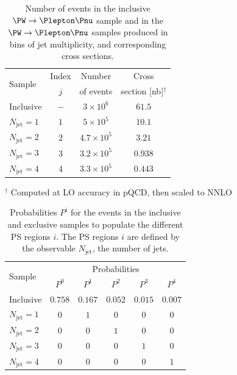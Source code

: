 \documentclass[twocolumn,epjc3]{svjour3}
\newcommand{\jet}{\ensuremath{\textrm{jet}}\xspace}
\begin{document}
\begin{table}
\caption{
  Number of events in the inclusive $\PW \to \Plepton\Pnu$ sample and in the $\PW \to \Plepton\Pnu$ samples produced in bins of jet multiplicity,
  and corresponding cross sections.
}
\label{tab:samples_WJets_vs_Njet}
\begin{center}
\begin{tabular}{l|c|c|c}
\hline
\multirow{2}{12mm}{Sample} & Index & Number    & Cross                    \\
                           & $j$   & of events & section [nb]$^{\dagger}$ \\
\hline
Inclusive                  & $-$   & $3 \times 10^{6}$   & $61.5$         \\
\hline
$N_{\jet} = 1$             & $1$   & $5 \times 10^{5}$   & $10.1$         \\
$N_{\jet} = 2$             & $2$   & $4.7 \times 10^{5}$ & $3.21$         \\
$N_{\jet} = 3$             & $3$   & $3.2 \times 10^{5}$ & $0.938$        \\
$N_{\jet} = 4$             & $4$   & $3.3 \times 10^{5}$ & $0.443$        \\
\hline
\end{tabular}
\end{center}
$^{\dagger}$ Computed at LO accuracy in pQCD, then scaled to NNLO
\end{table}

\begin{table}
\caption{
  Probabilities $P^{i}$ for the events in the inclusive and exclusive samples to populate the different PS regions $i$.
  The PS regions $i$ are defined by the observable $N_{\jet}$, the number of jets.
}
\label{tab:probabilities_WJets_vs_Njet}
\begin{center}
\begin{tabular}{l|ccccc}
\hline
\multirow{2}{12mm}{Sample} & \multicolumn{5}{c}{Probabilities}               \\
                           & $P^{0}$ & $P^{1}$ & $P^{2}$ & $P^{3}$ & $P^{4}$ \\
\hline
Inclusive                  & $0.758$ & $0.167$ & $0.052$ & $0.015$ & $0.007$ \\
\hline
$N_{\jet} = 1$             & $0$     & $1$     & $0$     & $0$     & $0$     \\
$N_{\jet} = 2$             & $0$     & $0$     & $1$     & $0$     & $0$     \\
$N_{\jet} = 3$             & $0$     & $0$     & $0$     & $1$     & $0$     \\
$N_{\jet} = 4$             & $0$     & $0$     & $0$     & $0$     & $1$     \\
\hline
\end{tabular}
\end{center}
\end{table}
\end{document}
